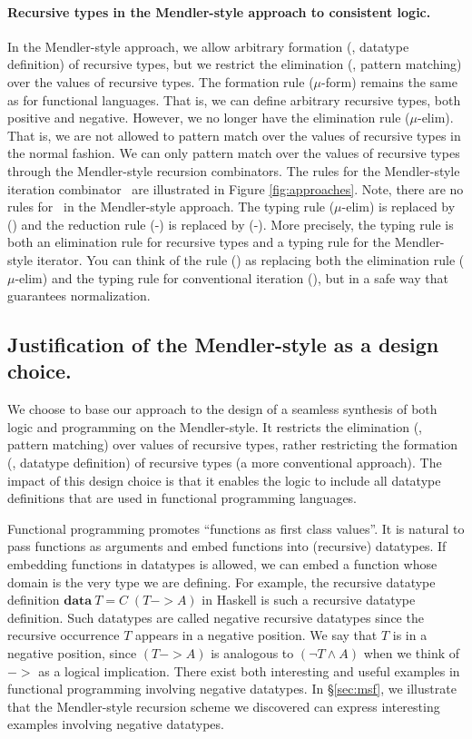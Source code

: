 \paragraph{Recursive types in the Mendler-style approach to consistent logic.}
In the Mendler-style approach, we allow arbitrary formation
(\ie, datatype definition) of recursive types, but we restrict
the elimination (\ie, pattern matching) over the values of recursive types. 
The formation rule {\small($\mu$-form)} remains the same as
for functional languages. That is, we can define arbitrary recursive types,
both positive and negative. However, we no longer have the elimination
rule {\small($\mu$-elim)}. That is, we are not allowed to pattern match over
the values of recursive types in the normal fashion. We can only pattern match
over the values of recursive types through the Mendler-style recursion
combinators. The rules for the Mendler-style iteration combinator \MIt\
are illustrated in Figure \ref{fig:approaches}.
Note, there are no rules for \unIn\ in the Mendler-style approach.
The typing rule {\small($\mu$-elim)} is replaced by {\small(\MIt)} and
the reduction rule {\small(\unIn-\In)} is replaced by {\small(\MIt-\In)}.
More precisely, the typing rule {\small \MIt} is both an elimination rule
for recursive types and a typing rule for the Mendler-style iterator.
You can think of the rule {\small(\MIt)} as replacing both the elimination rule
{\small($\mu$-elim)} and the typing rule for conventional iteration
{\small(\It)}, but in a safe way that guarantees normalization.

\subsection{Justification of the Mendler-style as a design choice.}
\label{APP:sec:intro:concepts:mendler}
We choose to base our approach to the design of a seamless synthesis of both
logic and programming on the Mendler-style. It restricts the elimination (\ie,
pattern matching) over values of recursive types, rather restricting the
formation (\ie, datatype definition) of recursive types (a more conventional
approach). The impact of this design choice is that it enables the logic to
include all datatype definitions that are used in functional programming
languages.

Functional programming promotes ``functions as first class values''.
It is natural to pass functions as arguments and embed functions into
(recursive) datatypes. If embedding functions in datatypes is allowed,
we can embed a function whose domain is the very type we are defining.
For example, the recursive datatype definition
$\mathbf{data}~T = C\;(T -> \textit{A})$ in Haskell is such a recursive
datatype definition. Such datatypes are called negative recursive datatypes
since the recursive occurrence $T$ appears in a negative position.
We say that $T$ is in a negative position, since $(T -> A)$ is analogous to
$(\neg T \land A)$ when we think of $->$ as a logical implication. There exist
both interesting and useful examples in functional programming involving
negative datatypes. In \S\ref{sec:msf}, we illustrate that
the Mendler-style recursion scheme we discovered can express
interesting examples involving negative datatypes.

